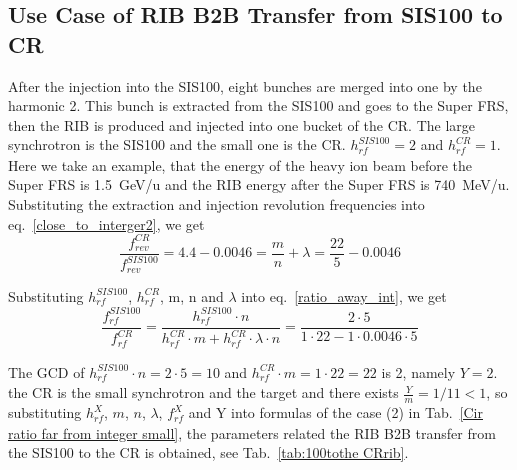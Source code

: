 \subsection{Use Case of RIB B2B Transfer from SIS100 to CR} 
\label{RIB_100_CR}
After the injection into the SIS100, eight bunches are merged into one by the harmonic 2. This bunch is extracted from the SIS100 and goes to the Super FRS, then the RIB is produced and injected into one bucket of the CR. The large synchrotron is the SIS100 and the small one is the CR. $h^{\mathit{SIS100}}_\mathit{rf}=2$ and $h^{\mathit{CR}}_\mathit{rf}=1$. Here we take an example, that the energy of the heavy ion beam before the Super FRS is \SI{1.5}{GeV/\atomicmassunit} and the RIB energy after the Super FRS is \SI{740}{MeV/\atomicmassunit}. Substituting the extraction and injection revolution frequencies into eq.~\ref{close_to_interger2}, we get
\begin{equation} 
\frac{f_{\mathit{rev}}^{\mathit{CR}}}{f_{\mathit{rev}}^{\mathit{SIS100}}}=4.4-0.0046=\frac{m}{n}+ \lambda=\frac{22}{5}-0.0046
\end{equation}

Substituting $h^{\mathit{SIS100}}_\mathit{rf}$, $h^{\mathit{CR}}_\mathit{rf}$, m, n and $\lambda$ into eq.~\ref{ratio_away_int}, we get
\begin{equation} 
\frac{f_{\mathit{rf}}^{\mathit{SIS100}}}{f_{\mathit{rf}}^{\mathit{CR}}}=\frac{h^{\mathit{SIS100}}_\mathit{rf}\cdot n}{h^{\mathit{CR}}_\mathit{rf} \cdot m+ h^{\mathit{CR}}_\mathit{rf} \cdot\lambda\cdot n}=\frac{2\cdot 5}{1 \cdot 22- 1 \cdot0.0046\cdot 5}
\end{equation}

The GCD of $h^{\mathit{SIS100}}_\mathit{rf}\cdot n=2\cdot5=10$ and $h^{\mathit{CR}}_\mathit{rf} \cdot m=1\cdot 22=22$ is 2, namely $Y=2$. the CR is the small synchrotron and the target and there exists $\frac{Y}{m}=1/11<1$, so substituting $h^X_\mathit{rf}$, $m$, $n$, $\lambda$, $f_{\mathit{rf}}^{X}$ and Y into formulas of the case (2) in Tab.~\ref{Cir ratio far from integer small}, the parameters related the RIB B2B transfer from the SIS100 to the CR is obtained, see Tab.~\ref{tab:100tothe CRrib}.

